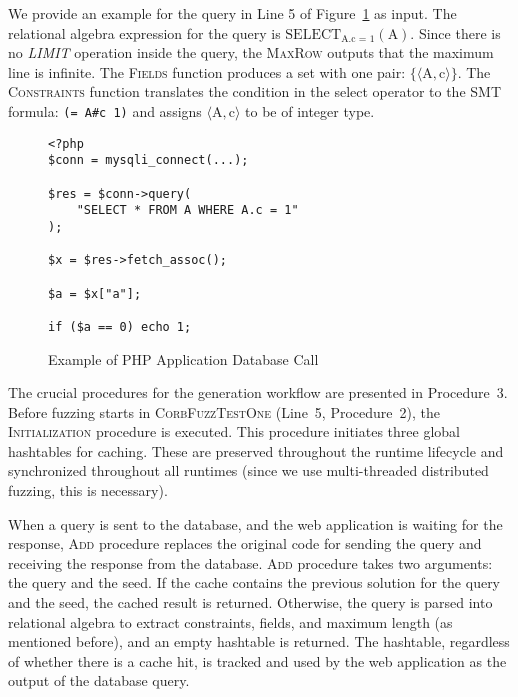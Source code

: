 \documentclass[10pt,conference]{IEEEtran}
\begin{document}
We provide an example for the query in Line 5 of Figure~\ref{code: php db} as input. The relational algebra expression for the query is $\text{SELECT}_{\text{A.c = 1}}(\text{A})$. Since there is no \textit{LIMIT} operation inside the query, the \textsc{MaxRow} outputs that the maximum line is infinite. The \textsc{Fields} function produces a set with one pair: $\{ \langle \text{A}, \text{c}\rangle \}$. The \textsc{Constraints} function translates the condition in the select operator to the SMT formula: \verb|(= A#c 1)| and assigns $\langle\text{A}, \text{c}\rangle$ to be of integer type. 


\begin{figure} [t] \small
    \centering

\begin{lstlisting}
<?php
$conn = mysqli_connect(...);

$res = $conn->query(
    "SELECT * FROM A WHERE A.c = 1"
);

$x = $res->fetch_assoc();

$a = $x["a"];

if ($a == 0) echo 1;
\end{lstlisting}
    \caption{Example of PHP Application Database Call}
    \label{code: php db}
\end{figure}

The crucial procedures for the generation workflow are presented in Procedure~3. Before fuzzing starts in \textsc{CorbFuzzTestOne} (Line~5, Procedure~2), the \textsc{Initialization} procedure is executed. This procedure initiates three global hashtables for caching. These are preserved throughout the runtime lifecycle and synchronized throughout all runtimes 
(since we use multi-threaded distributed fuzzing, this is necessary).  

When a query is sent to the database, and the web application is waiting for the response, \textsc{Add} procedure replaces the original code for sending the query and receiving the response from the database. 
\textsc{Add} procedure takes two arguments: the query and the seed.
If the cache contains the previous solution for the query and the seed, the cached result is returned. Otherwise, the query is parsed into relational algebra to extract constraints, fields, and maximum length (as mentioned before), and an empty hashtable is returned. The hashtable, regardless of whether there is a cache hit, is tracked and used by the web application as the output of the database query.
\end{document}
